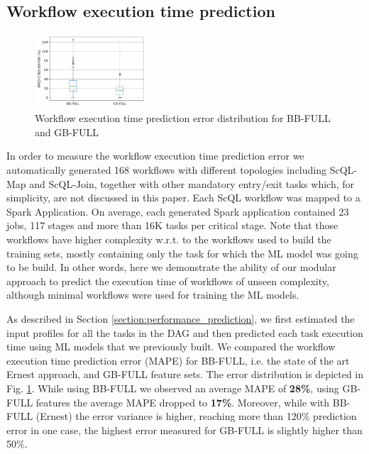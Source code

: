 \documentclass[a4paper, 10pt, conference]{ieeeconf}      %
\begin{document}
\subsection{Workflow execution time prediction}
\label{subsec:results-workflow}
\begin{figure}
  \centering
  \includegraphics[width=0.37\textwidth]{sources/wexec.png}
  \caption{Workflow execution time prediction error distribution for BB-FULL and GB-FULL}
  \label{fig:workex-boxolot}
\end{figure}
In order to measure the workflow execution time prediction error we automatically generated 168 workflows  with different topologies including ScQL-Map and ScQL-Join, together with other mandatory entry/exit tasks which, for simplicity, are not discussed in this paper.  \color{black}Each ScQL workflow was mapped to a Spark Application. On average, each generated Spark application contained 23 jobs, 117 stages and more than 16K tasks per critical stage. \color{black}
Note that those workflows have higher complexity w.r.t. to the workflows used to build the training sets, mostly containing only the task for which the ML model was going to be build.
In other words, here we demonstrate the ability of our modular approach to predict the execution time of workflows of unseen complexity, although minimal workflows were used for training the ML models.

As described in Section \ref{section:performance_prediction}, we first estimated the input profiles for all the tasks in the DAG and then predicted each task execution time using ML models that we previously built.
We compared the workflow execution time prediction error (MAPE) for BB-FULL, i.e. the state of the art Ernest approach, and GB-FULL feature sets. The error distribution is depicted in Fig. \ref{fig:workex-boxolot}. While using BB-FULL we observed an average MAPE of \textbf{28\%}, using GB-FULL features the average MAPE dropped to \textbf{17\%}.   Moreover, while with BB-FULL (Ernest)  the error variance is higher, reaching more than 120\% prediction error in one case, the highest error measured for GB-FULL is slightly higher than 50\%.

\end{document}
